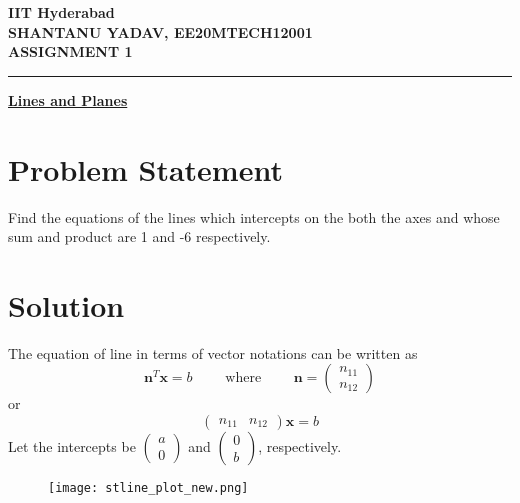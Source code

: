 \documentclass[12pt]{article}
\begin{document}
\begin{center}
	{\Large \bf IIT Hyderabad} \\ \vspace{2ex}
	{\large \bf SHANTANU YADAV, EE20MTECH12001 }\\
	\vspace{2ex}
	{\large \bf ASSIGNMENT 1} \\
\end{center}
	\hrule

\vspace{2ex}
\begin{center}
{\underline{\Large \bf Lines and Planes}}
\end{center}

\section*{Problem Statement}
Find the equations of the lines which intercepts on the both the axes and whose sum and product are 1 and -6 respectively.

\section*{Solution}
The equation of line in terms of vector notations can be written as
\begin{equation}
	{\mathbf{n}^T}{\mathbf x} = b 
	\qquad \text{ where } \qquad 
	\mathbf{n} = 
\begin{pmatrix}
	n_{11} \\ 
	n_{12}
\end{pmatrix}
\end{equation}
	or
\begin{equation}
\begin{pmatrix}
	n_{11} & n_{12}
\end{pmatrix}
	{\mathbf{x}} = b	\label{eq2}
\end{equation}
Let the intercepts be 
$\displaystyle
\begin{pmatrix}
	a \\ 0
\end{pmatrix}$
and 
$\displaystyle
\begin{pmatrix}
	0 \\ b
\end{pmatrix}$, respectively. \\


\begin{figure}


\centering
\texttt{[image: stline\_plot\_new.png]}


\caption{}
\end{figure}
\end{document}
